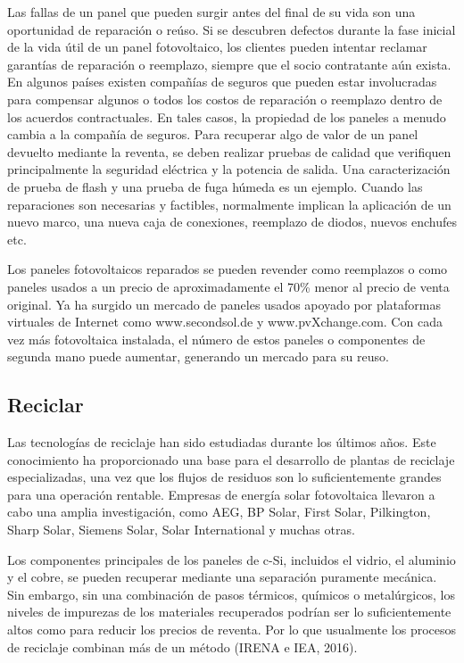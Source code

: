 Las fallas de un panel que pueden surgir antes del final de su vida son una oportunidad de reparación o reúso. Si se descubren defectos durante la fase inicial de la vida útil de un panel fotovoltaico, los clientes pueden intentar reclamar garantías de reparación o reemplazo, siempre que el socio contratante aún exista. En algunos países existen compañías de seguros que pueden estar involucradas para compensar algunos o todos los costos de reparación o reemplazo dentro de los acuerdos contractuales. En tales casos, la propiedad de los paneles a menudo cambia a la compañía de seguros. Para recuperar algo de valor de un panel devuelto mediante la reventa, se deben realizar pruebas de calidad que verifiquen principalmente la seguridad eléctrica y la potencia de salida. Una caracterización de prueba de flash y una prueba de fuga húmeda es un ejemplo. Cuando las reparaciones son necesarias y factibles, normalmente implican la aplicación de un nuevo marco, una nueva caja de conexiones, reemplazo de diodos, nuevos enchufes etc.

Los paneles fotovoltaicos reparados se pueden revender como reemplazos o como paneles usados a un precio de aproximadamente el 70\% menor al precio de venta original. Ya ha surgido un mercado de paneles usados apoyado por plataformas virtuales de Internet como www.secondsol.de y www.pvXchange.com. Con cada vez más fotovoltaica instalada, el número de estos paneles o componentes de segunda mano puede aumentar, generando un mercado para su reuso.

 \subsection{Reciclar}
\label{sec:reciclar}

Las tecnologías de reciclaje han sido estudiadas durante los últimos años. Este conocimiento ha proporcionado una base para el desarrollo de plantas de reciclaje especializadas, una vez que los flujos de residuos son lo suficientemente grandes para una operación rentable. Empresas de energía solar fotovoltaica llevaron a cabo una amplia investigación, como AEG, BP Solar, First Solar, Pilkington, Sharp Solar, Siemens Solar, Solar International y muchas otras.

Los componentes principales de los paneles de c-Si, incluidos el vidrio, el aluminio y el cobre, se pueden recuperar mediante una separación puramente mecánica. Sin embargo, sin una combinación de pasos térmicos, químicos o metalúrgicos, los niveles de impurezas de los materiales recuperados podrían ser lo suficientemente altos como para reducir los precios de reventa. Por lo que usualmente los procesos de reciclaje combinan más de un método (IRENA e IEA, 2016).

